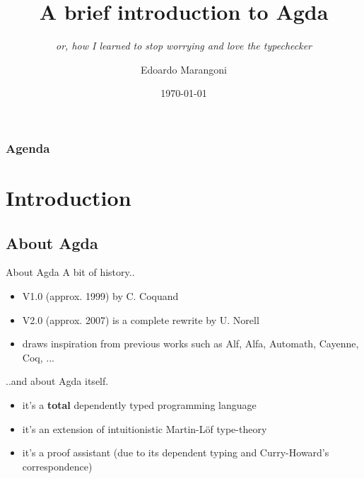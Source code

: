 \documentclass[t,aspectratio=169,9pt]{beamer}
\title{A brief introduction to Agda}
\subtitle{\it or, how I learned to stop worrying and love the typechecker }
\date{\today}
\author{Edoardo Marangoni}
\begin{document}
\frame[plain]{\titlepage}

\begin{frame}[t,plain]
	\frametitle{Agenda}
	\tableofcontents
\end{frame}

\section[intro]{Introduction}
\subsection[about]{About Agda}
\begin{frame}{About Agda}
  \vfill
  A bit of history..
  \vfill
  \begin{itemize}
    \item {V1.0 (approx. 1999) by C. Coquand}
    \item {V2.0 (approx. 2007) is a complete rewrite by U. Norell}
    \item {draws inspiration from previous works such as Alf, Alfa, Automath, Cayenne,
      Coq, ... }
  \end{itemize}
  \vfill
  ..and about Agda itself.
  \vfill
  \begin{itemize}
    \item {it's a {\bf total} dependently typed programming language}
    \item {it's an extension of intuitionistic Martin-Löf type-theory}
    \item {it's a proof assistant (due to its dependent typing and Curry-Howard's
      correspondence)}
  \end{itemize}
  \vfill
\end{frame}
\end{document}
